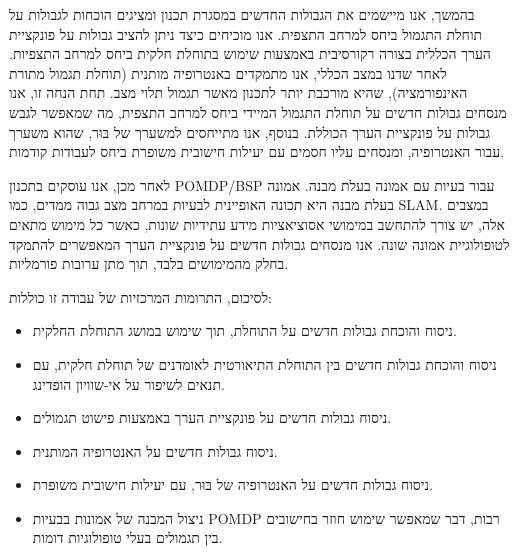 {בהמשך, אנו מיישמים את הגבולות החדשים במסגרת תכנון ומציגים הוכחות לגבולות על תוחלת התגמול ביחס למרחב התצפית. אנו מוכיחים כיצד ניתן להציב גבולות על פונקציית הערך הכללית בצורה רקורסיבית באמצעות שימוש בתוחלת חלקית ביחס למרחב התצפיות. לאחר שדנו במצב הכללי, אנו מתמקדים באנטרופיה מותנית (תוחלת תגמול מתורת האינפורמציה), שהיא מורכבת יותר לתכנון מאשר תגמול תלוי מצב. תחת הנחה זו, אנו מנסחים גבולות חדשים על תוחלת התגמול המיידי ביחס למרחב התצפית, מה שמאפשר לגבש גבולות על פונקציית הערך הכוללת. בנוסף, אנו מתייחסים למשערך של בּוּר, שהוא משערך עבור האנטרופיה, ומנסחים עליו חסמים עם יעילות חישובית משופרת ביחס לעבודות קודמות.

לאחר מכן, אנו עוסקים בתכנון \textenglish{POMDP}/\textenglish{BSP} עבור בעיות עם אמונה בעלת מבנה. אמונה בעלת מבנה היא תכונה האופיינית לבעיות במרחב מצב גבוה ממדים, כמו \textenglish{SLAM}. במצבים אלה, יש צורך להתחשב במימושי אסוציאציות מידע עתידיות שונות, כאשר כל מימוש מתאים לטופולוגיית אמונה שונה. אנו מנסחים גבולות חדשים על פונקציית הערך המאפשרים להתמקד בחלק מהמימושים בלבד, תוך מתן ערובות פורמליות.

לסיכום, התרומות המרכזיות של עבודה זו כוללות:
\begin{itemize}
	\item	ניסוח והוכחת גבולות חדשים על התוחלת, תוך שימוש במושג התוחלת החלקית.
	\item 	ניסוח והוכחת גבולות חדשים בין התוחלת התיאורטית לאומדנים של תוחלת חלקית, עם תנאים לשיפור על אי-שוויון הופדינג.
	\item	ניסוח גבולות חדשים על פונקציית הערך באמצעות פישוט תגמולים.
	\item	ניסוח גבולות חדשים על האנטרופיה המותנית.
	\item 	ניסוח גבולות חדשים על האנטרופיה של בּוּר, עם יעילות חישובית משופרת.
	\item	ניצול המבנה של אמונות בבעיות \textenglish{POMDP}  רבות, דבר שמאפשר שימוש חוזר בחישובים בין תגמולים בעלי טופולוגיות דומות.
\end{itemize}


} %

